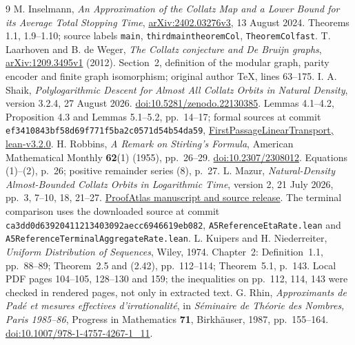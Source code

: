 \documentclass[11pt]{article}
\theoremstyle{remark}\newtheorem{remark}[proposition]{Remark}
\begin{document}
\begin{thebibliography}{9}
 M. Inselmann,
\emph{An Approximation of the Collatz Map and a Lower Bound for its Average Total Stopping Time},
\href{https://arxiv.org/abs/2402.03276v3}{arXiv:2402.03276v3}, 13 August 2024.
Theorems 1.1, 1.9--1.10; source labels \texttt{main},
\texttt{thirdmaintheoremCol}, \texttt{TheoremColfast}.
 T. Laarhoven and B. de Weger,
\emph{The Collatz conjecture and De Bruijn graphs},
\href{https://arxiv.org/abs/1209.3495v1}{arXiv:1209.3495v1} (2012).
Section~2, definition of the modular graph, parity encoder and finite
graph isomorphism; original author TeX, lines 63--175.
 I. A. Shaik,
\emph{Polylogarithmic Descent for Almost All Collatz Orbits in Natural Density},
version 3.2.4, 27 August 2026.
\href{https://doi.org/10.5281/zenodo.22130385}{doi:10.5281/zenodo.22130385}.
Lemmas 4.1--4.2, Proposition 4.3 and Lemmas 5.1--5.2,
pp.~14--17; formal sources at commit
\texttt{ef3410843bf58d69f771f5ba2c0571d54b54da59},
\href{https://github.com/shaikidris/FirstPassageLinearTransport/tree/lean-v3.2.0}{FirstPassageLinearTransport, lean-v3.2.0}.
 H. Robbins, \emph{A Remark on Stirling's Formula},
American Mathematical Monthly \textbf{62}(1) (1955), pp.~26--29.
\href{https://doi.org/10.2307/2308012}{doi:10.2307/2308012}.
Equations (1)--(2), p.~26; positive remainder series (8), p.~27.
 L. Mazur,
\emph{Natural-Density Almost-Bounded Collatz Orbits in Logarithmic Time},
version 2, 21 July 2026, pp.~3, 7--10, 18, 21--27.
\href{https://www.proofatlas.ai/formalizations/natural-density-log-time-collatz/}{ProofAtlas manuscript and source release}.
The terminal comparison uses the downloaded source at commit
\texttt{ca3dd0d63920411213403092aecc6946619eb082},
\texttt{A5ReferenceEtaRate.lean} and
\texttt{A5ReferenceTerminalAggregateRate.lean}.
 L. Kuipers and H. Niederreiter,
\emph{Uniform Distribution of Sequences}, Wiley, 1974.
Chapter~2: Definition~1.1, pp.~88--89; Theorem~2.5 and (2.42),
pp.~112--114; Theorem~5.1, p.~143. Local PDF pages 104--105,
128--130 and 159; the inequalities on pp.~112, 114, 143 were checked
in rendered pages, not only in extracted text.
 G. Rhin, \emph{Approximants de Pad\'e et mesures
effectives d'irrationalit\'e}, in \emph{S\'eminaire de Th\'eorie
des Nombres, Paris 1985--86}, Progress in Mathematics \textbf{71},
Birkh\"auser, 1987, pp.~155--164.
\href{https://doi.org/10.1007/978-1-4757-4267-1_11}{doi:10.1007/978-1-4757-4267-1\_11}.

\end{thebibliography}
\end{document}
